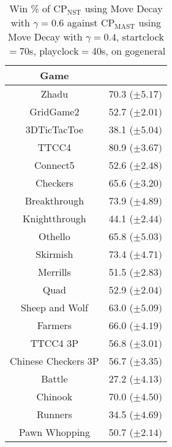 \documentclass[journal]{IEEEtran}
\begin{document}
\begin{table}[h]
\vspace{-12pt}
\caption{Win \%  of CP$_{\textrm{NST}}$ using Move Decay with $\gamma=0.6$ against CP$_{\textrm{MAST}}$ using Move Decay with $\gamma=0.4$, startclock$=$70s, playclock$=$40s, on gogeneral}
\label{table:NSTvsMAST}
\centering
\begin{tabular}{|c|c|}
\hline
 \textbf{Game} & \\
\hline\hline
Zhadu & 70.3 ($\pm 5.17)$  \\ 
GridGame2 & 52.7 ($\pm 2.01)$   \\ 
3DTicTacToe & 38.1 ($\pm 5.04)$   \\ 
TTCC4 & 80.9 ($\pm 3.67)$  \\ 
Connect5 & 52.6 ($\pm 2.48)$   \\ 
Checkers & 65.6 ($\pm 3.20)$    \\ 
Breakthrough & 73.9 ($\pm 4.89)$    \\ 
Knightthrough & 44.1 ($\pm 2.44)$    \\ 
Othello & 65.8 ($\pm 5.03)$    \\ 
Skirmish & 73.4 ($\pm 4.71)$   \\ 
Merrills & 51.5 ($\pm 2.83)$   \\ 
Quad & 52.9 ($\pm 2.04)$ \\ 
Sheep and Wolf & 63.0 ($\pm 5.09)$ \\ 
\hline
Farmers & 66.0 ($\pm 4.19)$  \\ 
TTCC4 3P & 56.8 ($\pm 3.01)$  \\ 
Chinese Checkers 3P & 56.7 ($\pm 3.35)$ \\ 
\hline
Battle & 27.2 ($\pm 4.13)$  \\ 
Chinook & 70.0 ($\pm 4.50)$   \\ 
Runners & 34.5 ($\pm 4.69)$ \\ 
Pawn Whopping & 50.7 ($\pm 2.14)$  \\ \hline
\end{tabular}
\vspace{-12pt}
\end{table}
\end{document}

